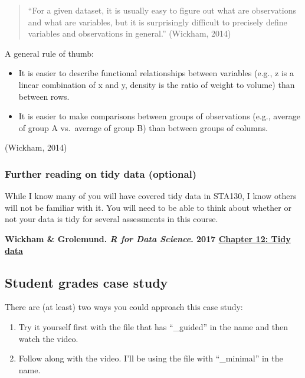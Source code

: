 \documentclass[
  openany]{book}
\providecommand{\tightlist}{%
  \setlength{\itemsep}{0pt}\setlength{\parskip}{0pt}}
\begin{document}
\begin{quote}
``For a given dataset, it is usually easy to figure out what are observations and what are variables, but it is surprisingly difficult to precisely define variables and observations in general.'' (Wickham, 2014)
\end{quote}

A general rule of thumb:

\begin{itemize}
\item
  It is easier to describe functional relationships between variables (e.g., z is a linear combination of x and y, density is the ratio of weight to volume) than between rows.
\item
  It is easier to make comparisons between groups of observations (e.g., average of group A vs.~average of group B) than between groups of columns.
\end{itemize}

(Wickham, 2014)

\hypertarget{further-reading-on-tidy-data-optional}{%
\subsubsection{Further reading on tidy data (optional)}\label{further-reading-on-tidy-data-optional}}

While I know many of you will have covered tidy data in STA130, I know others will not be familiar with it. You will need to be able to think about whether or not your data is tidy for several assessments in this course.

\textbf{Wickham \& Grolemund. \emph{R for Data Science}. 2017 \href{https://r4ds.had.co.nz/tidy-data.html}{Chapter 12: Tidy data}}

\hypertarget{student-grades-case-study}{%
\subsection{Student grades case study}\label{student-grades-case-study}}

There are (at least) two ways you could approach this case study:

\begin{enumerate}
\def\labelenumi{\alph{enumi})}
\tightlist
\item
  Try it yourself first with the file that has ``\_guided'' in the name and then watch the video.\\
\item
  Follow along with the video. I'll be using the file with ``\_minimal'' in the name.
\end{enumerate}
\end{document}

